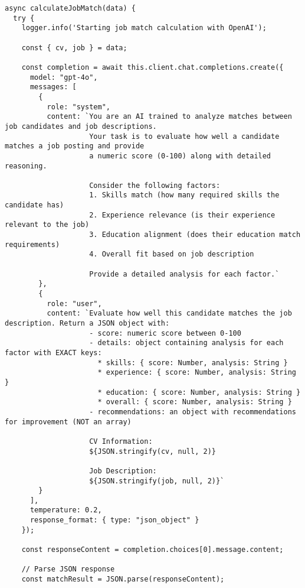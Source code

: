 \begin{verbatim}
async calculateJobMatch(data) {
  try {
    logger.info('Starting job match calculation with OpenAI');
    
    const { cv, job } = data;
    
    const completion = await this.client.chat.completions.create({
      model: "gpt-4o",
      messages: [
        {
          role: "system", 
          content: `You are an AI trained to analyze matches between job candidates and job descriptions.
                    Your task is to evaluate how well a candidate matches a job posting and provide
                    a numeric score (0-100) along with detailed reasoning.
                    
                    Consider the following factors:
                    1. Skills match (how many required skills the candidate has)
                    2. Experience relevance (is their experience relevant to the job)
                    3. Education alignment (does their education match requirements)
                    4. Overall fit based on job description
                    
                    Provide a detailed analysis for each factor.`
        },
        {
          role: "user",
          content: `Evaluate how well this candidate matches the job description. Return a JSON object with:
                    - score: numeric score between 0-100
                    - details: object containing analysis for each factor with EXACT keys:
                      * skills: { score: Number, analysis: String }
                      * experience: { score: Number, analysis: String }
                      * education: { score: Number, analysis: String }
                      * overall: { score: Number, analysis: String }
                    - recommendations: an object with recommendations for improvement (NOT an array)
                    
                    CV Information:
                    ${JSON.stringify(cv, null, 2)}
                    
                    Job Description:
                    ${JSON.stringify(job, null, 2)}`
        }
      ],
      temperature: 0.2,
      response_format: { type: "json_object" }
    });
    
    const responseContent = completion.choices[0].message.content;
    
    // Parse JSON response
    const matchResult = JSON.parse(responseContent);
    

\end{verbatim}

